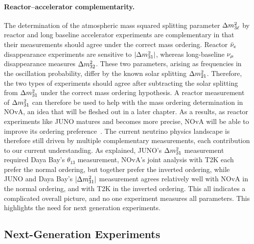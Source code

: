 \paragraph{Reactor--accelerator complementarity.}
The determination of the atmospheric mass squared splitting parameter $\Delta m^{2}_{3\ell}$ by reactor and long baseline
accelerator experiments are complementary in that their measurements should agree under the correct mass
ordering. Reactor $\bar\nu_e$ disappearance experiments are sensitive to $|\Delta m^{2}_{31}|$, whereas long-baseline $\nu_\mu$
disappearance measures $\Delta m^{2}_{32}$. These two parameters, arising as frequencies in the oscillation probability, differ 
by the known solar splitting $\Delta m^{2}_{21}$. Therefore, the two types of experiments should agree after subtracting the solar splitting
from $\Delta m^{2}_{31}$ under the correct mass ordering hypothesis. A reactor measurement of $\Delta m^{2}_{31}$ can therefore be used to help with 
the mass ordering determination in NOvA, an idea that will be fleshed out in a later chapter. As a results, as reactor experiments 
like JUNO matures and becomes more precise, NOvA will be able to improve its ordering preference~\cite{NOvAJUNO2026}.
The current neutrino physics landscape is therefore still driven by multiple complementary measurements, each 
contribution to our current understanding. As explained, JUNO's $\Delta m^{2}_{31}$ measurement required Daya Bay's $\theta_{13}$ 
measurement, NOvA's joint analysis with T2K each prefer the normal ordering, but together prefer the inverted ordering, 
while JUNO and Daya Bay's $|\Delta m^{2}_{31}|$ measurement agrees relatively well with NOvA in the normal ordering, and with T2K 
in the inverted ordering. This all indicates a complicated overall picture, and no one experiment measures all 
parameters. This highlights the need for next generation experiments. 

\subsection{Next-Generation Experiments}
\label{sec:landscape-nextgen}

